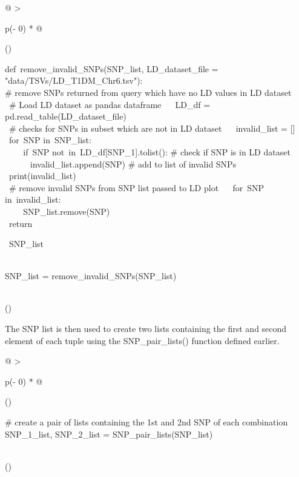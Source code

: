 \documentclass[12pt,a4paper]{article}
\begin{document}
\begin{longtable}[]{@{}
  >{\raggedright\arraybackslash}p{(\columnwidth - 0\tabcolsep) * }@{}}
\toprule()
\endhead
\begin{minipage}[t]{\linewidth}\raggedright
{def}{~}{remove\_invalid\_SNPs}{(SNP\_list, LD\_dataset\_file =
}{"data/TSVs/LD\_T1DM\_Chr6.tsv"}{):\\
}{\# remove SNPs returned from query which have no LD values in LD
dataset}{\hfill\break
~ ~}{\# Load LD dataset as pandas dataframe}{\hfill\break
~ ~LD\_df = pd.read\_table(LD\_dataset\_file)\\
\hspace*{0.333em} ~}{\# checks for SNPs in subset which are not in LD
dataset}{\hfill\break
~ ~invalid\_list = {[}{]}\\
\hspace*{0.333em} ~}{for}{~SNP }{in}{~SNP\_list:\\
\hspace*{0.333em} ~ ~ ~}{if}{~SNP
}{not}{~}{in}{~LD\_df{[}}{\textquotesingle SNP\_1\textquotesingle{}}{{]}.tolist():
}{\# check if SNP is in LD dataset}{\hfill\break
~ ~ ~ ~ ~ ~invalid\_list.append(SNP) }{\# add to list of invalid
SNPs}{\hfill\break
~ ~print(invalid\_list)\\
\hspace*{0.333em} ~}{\# remove invalid SNPs from SNP list passed to LD
plot}{\hfill\break
~ ~}{for}{~SNP }{in}{~invalid\_list:\\
\hspace*{0.333em} ~ ~ ~SNP\_list.remove(SNP)\\
\hspace*{0.333em} ~}{return}{~SNP\_list\\
\strut \\
SNP\_list = remove\_invalid\_SNPs(SNP\_list)}\strut
\end{minipage} \\
\bottomrule()
\end{longtable}

{}

{The SNP list is then used to create two lists containing the first and
second element of each tuple using the SNP\_pair\_lists() function
defined earlier.}

\protect\hypertarget{t.467397c9bfe0b58ffeebec61aad4b21b644362e1}{}{}\protect\hypertarget{t.12}{}{}

\begin{longtable}[]{@{}
  >{\raggedright\arraybackslash}p{(\columnwidth - 0\tabcolsep) * }@{}}
\toprule()
\endhead
\begin{minipage}[t]{\linewidth}\raggedright
{\# create a pair of lists containing the 1st and 2nd SNP of each
combination}{\hfill\break
SNP\_1\_list, SNP\_2\_list = SNP\_pair\_lists(SNP\_list)}\strut
\end{minipage} \\
\bottomrule()
\end{longtable}
\end{document}

